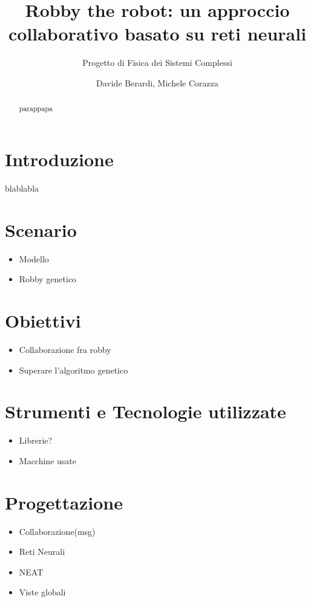 \documentclass[a4paper,10pt,abstracton]{scrartcl}
\begin{document}
\title{Robby the robot: un approccio collaborativo basato su reti neurali}
\subtitle{Progetto di Fisica dei Sistemi Complessi}

\author{Davide Berardi, Michele Corazza}



\maketitle

\begin{abstract}
parappapa
\end{abstract}

\section{Introduzione}
blablabla

\section{Scenario}
\begin{itemize}
 \item Modello
 \item Robby genetico
\end{itemize}


\section {Obiettivi}
\begin{itemize}
 \item Collaborazione fra robby
 \item Superare l'algoritmo genetico
\end{itemize}


\section{Strumenti e Tecnologie utilizzate}
\begin{itemize}
 \item Librerie?
 \item Macchine usate
\end{itemize}


\section{Progettazione}
\begin{itemize}
 \item Collaborazione(msg)
 \item Reti Neurali
 \item NEAT
 \item Viste globali
\end{itemize}
\end{document}

